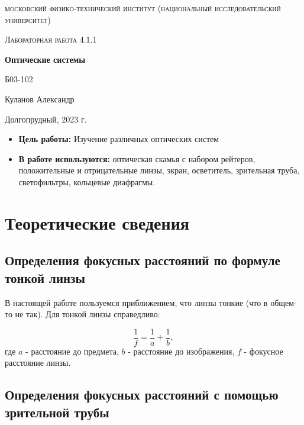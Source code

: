 \documentclass[a4paper, 12pt]{article}
\begin{document}
\begin{titlepage}
	\centering
	\vspace{5cm}
	{\scshape\LARGE московский физико-технический институт (национальный исследовательский университет) \par}
	\vspace{6cm}
	{\scshape\Large Лабораторная работа 4.1.1 \par}
	{\huge\bfseries Оптические системы \par}
	\vspace{1cm}
	\vfill
\begin{flushright}
	{\large Б03-102}\par
	\vspace{0.3cm}
	{\LARGE Куланов Александр}
\end{flushright}
	

	\vfill


	Долгопрудный, 2023 г.
\end{titlepage}

\begin{itemize}
	\item \textbf{Цель работы:} Изучение различных оптических систем
    \item \textbf{В работе используются:} оптическая скамья с набором рейтеров, положительные и отрицательные линзы,  экран, осветитель, зрительная труба, светофильтры, кольцевые диафрагмы.
\end{itemize}

\section{Теоретические сведения}
\subsection{Определения фокусных расстояний по формуле тонкой линзы}

В настоящей работе пользуемся приближением, что линзы тонкие (что в общем-то не так). Для тонкой линзы справедливо:

\begin{equation}
	\frac{1}{f}	= \frac{1}{a} + \frac{1}{b},
\end{equation}
где $a$ - расстояние до предмета, $b$ - расстояние до изображения, $f$ - фокусное расстояние линзы. 

\subsection{Определения фокусных расстояний с помощью зрительной трубы}
\end{document}
